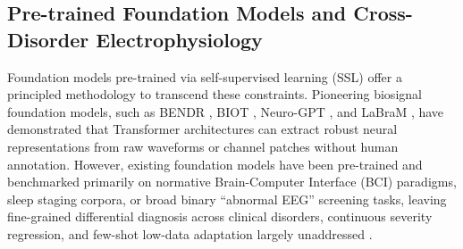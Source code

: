 \documentclass[11pt,a4paper]{article}
\begin{document}
\subsection{Pre-trained Foundation Models and Cross-Disorder Electrophysiology}
Foundation models pre-trained via self-supervised learning (SSL) offer a principled methodology to transcend these constraints. Pioneering biosignal foundation models, such as BENDR \cite{kostas2021bendr}, BIOT \cite{yang2023biot}, Neuro-GPT \cite{cui2023neurogpt}, and LaBraM \cite{jiang2024labram}, have demonstrated that Transformer architectures can extract robust neural representations from raw waveforms or channel patches without human annotation. However, existing foundation models have been pre-trained and benchmarked primarily on normative Brain-Computer Interface (BCI) paradigms, sleep staging corpora, or broad binary ``abnormal EEG'' screening tasks, leaving fine-grained differential diagnosis across clinical disorders, continuous severity regression, and few-shot low-data adaptation largely unaddressed \cite{kastrati2025eegbench}.
\end{document}
